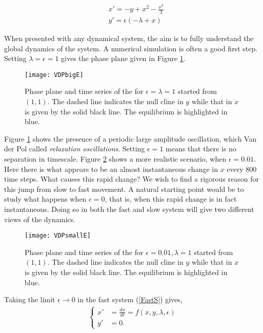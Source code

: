 \begin{equation}
\begin{aligned}
&x'=-y+x^2-\frac{x^3}{3} \\
&y'=\epsilon(-\lambda+x)
\end{aligned}
\label{eq: canonical}
\end{equation}

When presented with any dynamical system, the aim is to fully understand the global dynamics of the system. A numerical simulation is often a good first step. Setting $\lambda=\epsilon=1$ gives the phase plane given in Figure \ref{fig:VDPE1}.
\begin{figure}[]
	\texttt{[image: VDPbigE]}
	\caption[Van der Pol Dynamics with \texorpdfstring{$\epsilon=1$}{eps=1}]{Phase plane and time series of the \vdp for $\epsilon=\lambda=1$ started from $(1,1)$. The dashed line indicates the null cline in $y$ while that in $x$ is given by the solid black line. The equilibrium is highlighted in blue.}
	\label{fig:VDPE1}
\end{figure}
Figure \ref{fig:VDPE1} shows the presence of a  periodic large amplitude oscillation, which Van der Pol called \emph{relaxation oscillations}. Setting $\epsilon=1$ means that there is no separation in timescale. Figure \ref{fig:VDPE01} shows a more realistic scenario, when $\epsilon=0.01$. Here there is what appears to be an almost instantaneous change in $x$ every 800 time steps. What causes this rapid change? We wish to find a rigorous reason for this jump from slow to fast movement. A natural starting point would be to study what happens when $\epsilon=0$, that is, when this rapid change is in fact instantaneous. Doing so in both the fast and slow system will give two different views of the dynamics.
\begin{figure}[]
	\texttt{[image: VDPsmallE]}
	\caption[Van der Pol Dynamics with \texorpdfstring{$\epsilon=0.01$}{eps=0.1}]{Phase plane and time series of the \vdp for $\epsilon=0.01, \lambda=1$ started from $(1,1)$. The dashed line indicates the null cline in $y$ while that in $x$ is given by the solid black line. The equilibrium is highlighted in blue.}
	\label{fig:VDPE01}
\end{figure}
 Taking the limit $\epsilon \to 0$ in the fast system (\ref{FastS}) gives, \begin{align} \label{FastS0}
		\begin{cases}
			x' &=\frac{dx}{dt}= f(x,y,\lambda, \epsilon)\\
			y' &= 0.
		\end{cases}
	\end{align}
